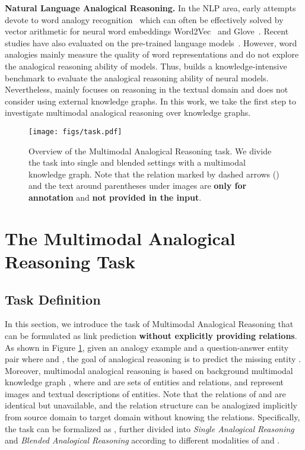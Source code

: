 \documentclass{article} \usepackage{iclr2023_conference,times}
\begin{document}
\textbf{Natural Language Analogical Reasoning.}
In the NLP area, early attempts devote to word analogy recognition~\citep{mikolov-etal-2013-linguistic,BATs,DBLP:conf/semeval/JurgensMTH12,DBLP:conf/acl/EthayarajhDH19a,DBLP:conf/naacl/GladkovaDM16} which can often be effectively solved by vector arithmetic for neural word embeddings Word2Vec~\citep{word2vec} and Glove~\citep{glove}. 
Recent studies have also evaluated on the pre-trained language models~\citep{bert,gpt,DBLP:conf/acl/UshioASC20}.
However, word analogies mainly measure the quality of word representations and do not explore the analogical reasoning ability of models. 
Thus, \cite{E-KAR} builds a knowledge-intensive benchmark to evaluate the analogical reasoning ability of neural models.
Nevertheless, \cite{E-KAR} mainly focuses on reasoning in the textual domain and does not consider using external knowledge graphs. 
In this work, we take the first step to investigate multimodal analogical reasoning over knowledge graphs.

\begin{figure}[!t]
\centering
\texttt{[image: figs/task.pdf]}
\caption{
Overview of the Multimodal Analogical Reasoning task. 
We divide the task into single and blended settings with a multimodal knowledge graph.
Note that the relation marked by dashed arrows () and the text around parentheses under images are \textbf{only for annotation} and \textbf{not provided in the input}.}
\label{fig:task}
\vspace{-0.3cm}
\end{figure}

\section{The Multimodal Analogical Reasoning Task}
\subsection{Task Definition}

In this section, we introduce the task of Multimodal Analogical Reasoning that can be formulated as link prediction  \textbf{without explicitly providing relations}. 
As shown in Figure \ref{fig:task}, given an analogy example  and a question-answer entity pair  where
 and  ,
the goal of analogical reasoning is to predict the missing entity . 
Moreover, multimodal analogical reasoning is based on
background multimodal knowledge graph , where  and 
are sets of entities and relations,
 and  represent images and textual descriptions of entities. 
Note that the relations of  and  are identical but unavailable, and the relation structure can be analogized implicitly from source domain to target domain without knowing the relations.
Specifically, the task can be formalized as , further divided into \emph{Single Analogical Reasoning} and \emph{Blended Analogical Reasoning} according to different modalities of  and .
\end{document}
